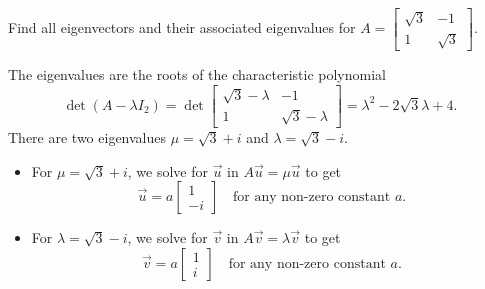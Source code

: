 \documentclass[../main.tex]{subfiles}
\begin{document}
\begin{exercise}
  Find all eigenvectors and their associated eigenvalues for \(A = \begin{bmatrix} \sqrt{3} & -1 \\ 1 & \sqrt{3} \end{bmatrix}\).

  \begin{solution}
    The eigenvalues are the roots of the characteristic polynomial \[\det(A - \lambda I_{2}) = \det \begin{bmatrix} \sqrt{3} - \lambda & -1 \\ 1 & \sqrt{3} - \lambda \end{bmatrix} = \lambda^{2} - 2 \sqrt{3} \lambda + 4.\]
    There are two eigenvalues \(\mu = \sqrt{3} + i\) and \(\lambda = \sqrt{3} - i\).

    \begin{itemize}
      \item For \(\mu = \sqrt{3} + i\), we solve for \(\vec{u}\) in \(A \vec{u} = \mu \vec{u}\) to get
        \[
          \vec{u} = a \begin{bmatrix} 1 \\ -i \end{bmatrix}
          \quad\text{for any non-zero constant } a.
        \]
      \item For \(\lambda = \sqrt{3} - i\), we solve for \(\vec{v}\) in \(A \vec{v} = \lambda \vec{v}\) to get
        \[
          \vec{v} = a \begin{bmatrix} 1 \\ i \end{bmatrix}
          \quad\text{for any non-zero constant } a.
        \]
    \end{itemize}
  \end{solution}
\end{exercise}
\end{document}
